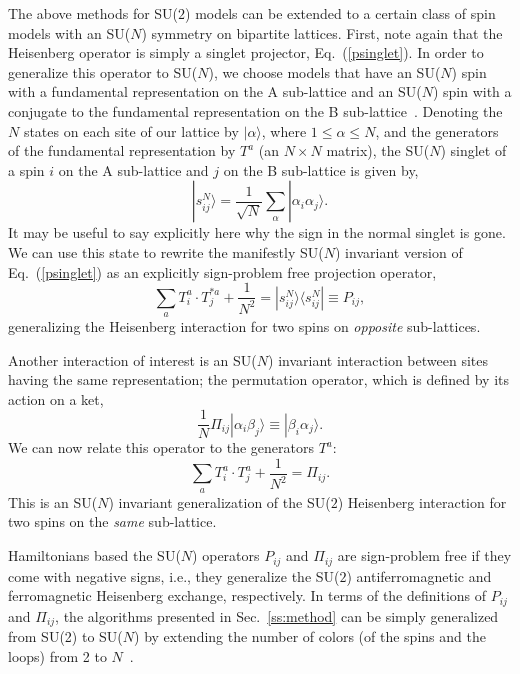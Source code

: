 \documentclass[range]{ar2e}
\begin{document}
The above methods for SU($2$) models can be extended to a certain class of spin models with an SU($N$) symmetry on bipartite lattices. First, note again 
that the Heisenberg operator is simply a singlet projector, Eq.~(\ref{psinglet}). In order to generalize this operator to SU($N$), we choose models 
that have an SU($N$) spin with a fundamental representation on the A sub-lattice and an SU($N$) spin with a conjugate to the fundamental representation 
on the B sub-lattice~\cite{affleck1985:lgN,Read89}. Denoting the $N$ states on each site of our lattice 
by $|\alpha\rangle$, where $1\leq \alpha \leq N$, and the generators of the fundamental representation by $T^a$ (an $N\times N$ matrix),
the SU($N$) singlet of a spin $i$ on the A sub-lattice and $j$ on the B sub-lattice is given by, 
\begin{equation}
|s^N_{ij}\rangle = \frac{1}{\sqrt{N}}\sum_\alpha |\alpha_i\alpha_j\rangle. 
\end{equation}
{\color{red} It may be useful to say explicitly here why the sign in the normal singlet is gone.}
We can use this state to rewrite the manifestly SU($N$) invariant version of Eq.~(\ref{psinglet}) as an explicitly sign-problem 
free projection operator,
\begin{equation}
\sum_a T^a_i \cdot
T^{*a}_j + \frac{1}{N^2} = |s^N_{ij}\rangle \langle s^N_{ij}|\equiv P_{ij},
\end{equation}
generalizing the Heisenberg interaction for two spins on {\em opposite} sub-lattices. 

Another interaction of interest is an SU($N$) invariant interaction between sites having the same representation; the permutation operator, 
which is defined by its action on a ket, 
\begin{equation}
\frac{1}{N}\Pi_{ij}|\alpha_i\beta_j\rangle \equiv |\beta_i\alpha_j\rangle. 
\label{pija}
\end{equation}
We can now relate this operator to the generators $T^a$:
\begin{equation}
\sum_a T^a_i \cdot
T^{a}_j +\frac{1}{N^2} =\Pi_{ij}.
\label{pijb}
\end{equation}
This is an SU($N$) invariant generalization of the SU($2$) Heisenberg interaction for two spins on the {\em same} sub-lattice.

Hamiltonians based the SU($N$) operators $P_{ij}$ and $\Pi_{ij}$ are sign-problem free if they come with negative signs, i.e.,
they generalize the SU($2$) antiferromagnetic and ferromagnetic Heisenberg exchange, respectively. In terms of the definitions of $P_{ij}$ and 
$\Pi_{ij}$, the algorithms presented in Sec.~\ref{ss:method} can be simply generalized from SU(2) to SU($N$) by extending the number of colors 
(of the spins and the loops) from 2 to $N$~\cite{harada2003:sun,beach2009:sun,kaul2011:j1j2}.
\end{document}
